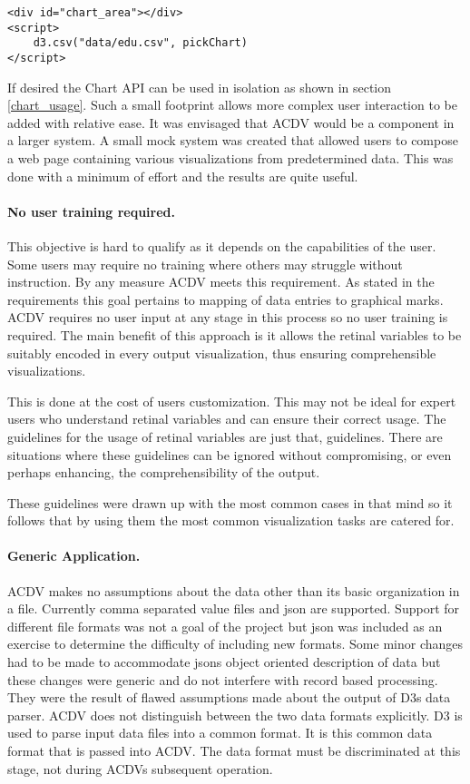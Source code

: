\documentclass[a4paper, 11pt, titlepage, onehalfspacing]{report}
\begin{document}
\begin{verbatim}
<div id="chart_area"></div>
<script>
    d3.csv("data/edu.csv", pickChart)
</script>
\end{verbatim}

If desired the Chart API can be used in isolation as shown in section \ref{chart_usage}. Such a small footprint allows more complex user interaction to be added with relative ease. It was envisaged that AC\lightning{}DV would be a component in a larger system. A small mock system was created that allowed users to compose a web page containing various visualizations from predetermined data. This was done with a minimum of effort and the results are quite useful. 

\paragraph{No user training required.}This objective is hard to qualify as it depends on the capabilities of the user. Some users may require no training where others may struggle without instruction. By any measure AC\lightning{}DV meets this requirement. As stated in the requirements this goal pertains to mapping of data entries to graphical marks. AC\lightning{}DV requires no user input at any stage in this process so no user training is required. The main benefit of this approach is it allows the retinal variables to be suitably encoded in every output visualization, thus ensuring comprehensible visualizations. 

This is done at the cost of users customization. This may not be ideal for expert users who understand retinal variables and can ensure their correct usage. The guidelines for the usage of retinal variables are just that, guidelines. There are situations where these guidelines can be ignored without compromising, or even perhaps enhancing, the comprehensibility of the output. 

These guidelines were drawn up with the most common cases in that mind so it follows that by using them the most common visualization tasks are catered for.

\paragraph{Generic Application.}
\label{generic_application}
AC\lightning{}DV makes no assumptions about the data other than its basic organization in a file. Currently comma separated value files and json are supported. Support for different file formats was not a goal of the project but json was included as an exercise to determine the difficulty of including new formats. Some minor changes had to be made to accommodate jsons object oriented description of data but these changes were generic and do not interfere with record based processing. They were the result of flawed assumptions made about the output of D3s data parser. AC\lightning{}DV does not distinguish between the two data formats explicitly. D3 is used to parse input data files into a common format. It is this common data format that is passed into AC\lightning{}DV. The data format must be discriminated at this stage, not during AC\lightning{}DVs subsequent operation. 
\end{document}
